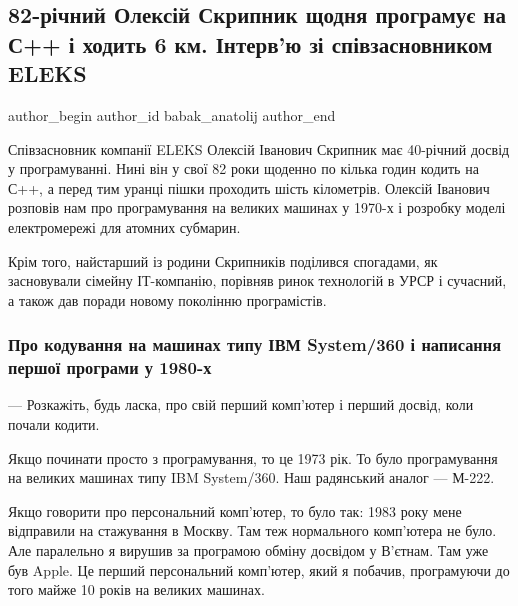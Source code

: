  
 
 
 
 
 
\subsection{82-річний Олексій Скрипник щодня програмує на С++ і ходить 6 км. Інтерв’ю зі співзасновником ELEKS}
\label{sec:26_01_2022.stz.pc.ua.dou.1.interview_aleksej_skripnik}
 
\ifcmt
 author_begin
   author_id babak_anatolij
 author_end
\fi

Співзасновник компанії ELEKS Олексій Іванович Скрипник має 40-річний досвід у
програмуванні. Нині він у свої 82 роки щоденно по кілька годин кодить на С++, а
перед тим уранці пішки проходить шість кілометрів. Олексій Іванович розповів
нам про програмування на великих машинах у 1970-х і розробку моделі
електромережі для атомних субмарин.


Крім того, найстарший із родини Скрипників поділився спогадами, як засновували
сімейну ІТ-компанію, порівняв ринок технологій в УРСР і сучасний, а також дав
поради новому поколінню програмістів.

\subsubsection{Про кодування на машинах типу ІВМ System/360 і написання першої програми у 1980-х}

— Розкажіть, будь ласка, про свій перший комп’ютер і перший досвід, коли почали
кодити.

Якщо починати просто з програмування, то це 1973 рік. То було програмування на
великих машинах типу IBM System/360. Наш радянський аналог — М-222.

Якщо говорити про персональний комп’ютер, то було так: 1983 року мене
відправили на стажування в Москву. Там теж нормального комп’ютера не було. Але
паралельно я вирушив за програмою обміну досвідом у В’єтнам. Там уже був Apple.
Це перший персональний комп’ютер, який я побачив, програмуючи до того майже 10
років на великих машинах.

